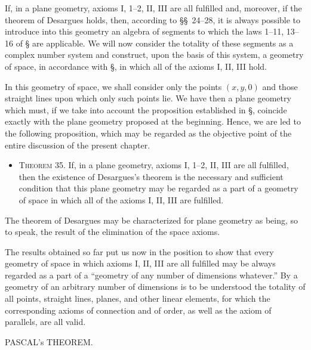 \documentclass[11pt,oneside]{book}
\begin{document}
\label{p30}

If, in a plane geometry, axioms I, 1--2, II, III are
all fulfilled and, moreover, if the theorem of Desargues
holds, then, according to \S\S~24--28, it is always
possible to introduce into this geometry an algebra of
segments to which the laws 1--11, 13--16 of \S{} are
applicable. We will now consider the totality of these
segments as a complex number system and construct,
upon the basis of this system, a geometry of space, in
accordance with \S{}, in which all of the axioms I, II,
III hold.

In this geometry of space, we shall consider only
the points $(x, y, 0)$ and those straight lines upon
which only such points lie. We have then a plane geometry
which must, if we take into account the proposition
established in \S{}, coincide exactly with the
plane geometry proposed at the beginning. Hence,
we are led to the following proposition, which may be
regarded as the objective point of the entire discussion
of the present chapter.

\begin{itemize}
\item[]{\scshape Theorem 35.} If, in a plane geometry, axioms I,
1--2, II, III are all fulfilled, then the existence of
Desargues's theorem is the necessary and sufficient
condition that this plane geometry may
be regarded as a part of a geometry of space in
which all of the axioms I, II, III are fulfilled.
\end{itemize}

The theorem of Desargues may be characterized
for plane geometry as being, so to speak, the result
of the elimination of the space axioms.

The results obtained so far put us now in the position
to show that every geometry of space in which
axioms I, II, III are all fulfilled may be always regarded
as a part of a ``geometry of any number of dimensions
whatever.'' By a geometry of an arbitrary
number of dimensions is to be understood the totality
of all points, straight lines, planes, and other linear
elements, for which the corresponding axioms of connection
and of order, as well as the axiom of parallels,
are all valid.
\newpage
\begin{center}{\Large PASCAL's THEOREM.}\end{center}
\label{p31}
\end{document}
